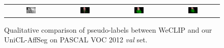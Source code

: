 \begin{figure}[ht]
\begin{tcolorbox}[colframe=black!60, colback=white, boxrule=0.8pt, arc=2pt, left=2pt, right=2pt, top=2pt, bottom=2pt]
\begin{tabular}{cccc}
      \includegraphics[width=0.20\textwidth,height=0.20\textwidth]
      {figures/originals/2011_000453}
                &
      \includegraphics[width=0.20\textwidth,height=0.20\textwidth]
      {figures/colored_gts/2011_000453}
                &
      \includegraphics[width=0.20\textwidth,height=0.20\textwidth]
      {figures/val_labels/weclip/2011_000453_[1, 4, 14]}
                &
      \includegraphics[width=0.20\textwidth,height=0.20\textwidth]
      {figures/val_labels/ours/2011_000453_[1, 4, 14]} \\
    \end{tabular}

    \caption{Qualitative comparison of pseudo-labels between WeCLIP and our UniCL-AffSeg on PASCAL VOC 2012 \textit{val} set.}
    \label{fig:qualitative_comparison_pseudolabel_val}
  \end{tcolorbox}
\end{figure}


